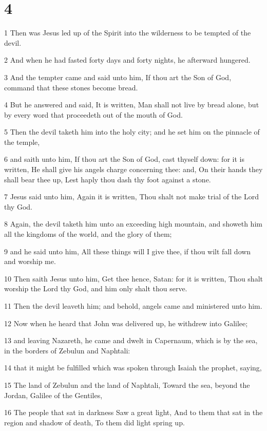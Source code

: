 \chapter{4}

\par 1 Then was Jesus led up of the Spirit into the wilderness to be tempted of the devil.
\par 2 And when he had fasted forty days and forty nights, he afterward hungered.
\par 3 And the tempter came and said unto him, If thou art the Son of God, command that these stones become bread.
\par 4 But he answered and said, It is written, Man shall not live by bread alone, but by every word that proceedeth out of the mouth of God.
\par 5 Then the devil taketh him into the holy city; and he set him on the pinnacle of the temple,
\par 6 and saith unto him, If thou art the Son of God, cast thyself down: for it is written, He shall give his angels charge concerning thee: and, On their hands they shall bear thee up, Lest haply thou dash thy foot against a stone.
\par 7 Jesus said unto him, Again it is written, Thou shalt not make trial of the Lord thy God.
\par 8 Again, the devil taketh him unto an exceeding high mountain, and showeth him all the kingdoms of the world, and the glory of them;
\par 9 and he said unto him, All these things will I give thee, if thou wilt fall down and worship me.
\par 10 Then saith Jesus unto him, Get thee hence, Satan: for it is written, Thou shalt worship the Lord thy God, and him only shalt thou serve.
\par 11 Then the devil leaveth him; and behold, angels came and ministered unto him.
\par 12 Now when he heard that John was delivered up, he withdrew into Galilee;
\par 13 and leaving Nazareth, he came and dwelt in Capernaum, which is by the sea, in the borders of Zebulun and Naphtali:
\par 14 that it might be fulfilled which was spoken through Isaiah the prophet, saying,
\par 15 The land of Zebulun and the land of Naphtali, Toward the sea, beyond the Jordan, Galilee of the Gentiles,
\par 16 The people that sat in darkness Saw a great light, And to them that sat in the region and shadow of death, To them did light spring up.
